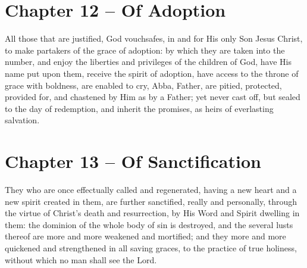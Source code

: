 \begin{outerlst}[left=0pt,labelsep=0pt]
\item
{}
\section{Chapter 12 -- Of Adoption}
\begin{innerlst}[resume*]

\item All those that are justified, God vouchsafes, in and for His only Son Jesus Christ, to make partakers of the grace of adoption: by which they are taken into the number, and enjoy the liberties and privileges of the children of God, have His name put upon them, receive the spirit of adoption, have access to the throne of grace with boldness, are enabled to cry, Abba, Father, are pitied, protected, provided for, and chastened by Him as by a Father; yet never cast off, but sealed to the day of redemption, and inherit the promises, as heirs of everlasting salvation.  
\end{innerlst}

\item
{}
\section{Chapter 13 -- Of Sanctification}
\begin{innerlst}[resume*]

\item They who are once effectually called and regenerated, having a new heart and a new spirit created in them, are further sanctified, really and personally, through the virtue of Christ's death and resurrection, by His Word and Spirit dwelling in them: the dominion of the whole body of sin is destroyed, and the several lusts thereof are more and more weakened and mortified; and they more and more quickened and strengthened in all saving graces, to the practice of true holiness, without which no man shall see the Lord.   


\end{innerlst}
\end{outerlst}
